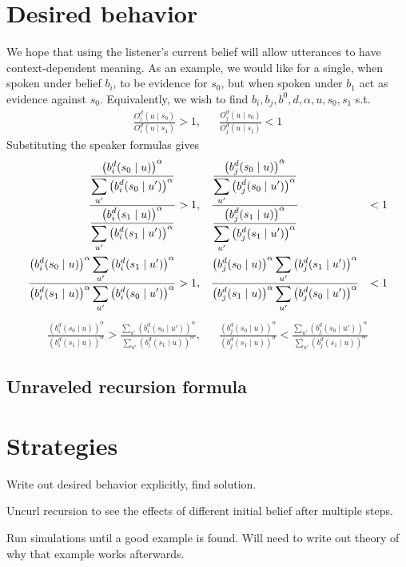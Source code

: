 \documentclass[12pt,fleqn,leqno,letterpaper]{article}
\newcommand\lstn[4]{b_{#4}^{#3}({#1}\mid {#2})}
\newcommand\lstna[4]{\left(\lstn{#1}{#2}{#3}{#4}\right)^{\alpha}}
\newcommand\spkr[4]{\ddfrac{\left(b_{#4}^{#3}({#1} \mid {#2})\right)^{\alpha}}{\sum_{u'}\left(b_{#4}^{#3}({#1} \mid u')\right)^{\alpha}}}
\newcommand\spkrrat[5]{\ddfrac{\left(\lstn{#1}{#3}{#4}{#5}\right)^{\alpha}\sum_{u'}\left(\lstn{#2}{u'}{#4}{#5}\right)^{\alpha}}{\left(\lstn{#2}{#3}{#4}{#5} \right)^{\alpha}\sum_{u'}\left(\lstn{#1}{u'}{#4}{#5}\right)^{\alpha}}}
\def\ddfrac#1#2{\displaystyle\frac{\displaystyle #1}{\displaystyle #2}}
\begin{document}
\section{Desired behavior}
We hope that using the listener's current belief will allow utterances to have context-dependent meaning. As an example, we would like for a single, when spoken under belief $b_i$, to be evidence for $s_0$, but when spoken under $b_1$ act as evidence against $s_0$. 
Equivalently, we wish to find $b_i, b_j, b^0, d, \alpha, u, s_0, s_1$ s.t.
\begin{align}
    \ddfrac{O_i^d(u \mid s_0)}{O_i^d(u \mid s_1)} > 1, && \ddfrac{O_j^d(u \mid s_0)}{O_j^d(u \mid s_1)} < 1
\end{align}
Substituting the speaker formulas gives
\begin{align}
	\ddfrac{\spkr{s_0}{u}{d}{i}}{\spkr{s_1}{u}{d}{i}} &> 1, && \ddfrac{\spkr{s_0}{u}{d}{j}}{\spkr{s_1}{u}{d}{j}} &< 1\\
	\spkrrat{s_0}{s_1}{u}{d}{i} &> 1, && \spkrrat{s_0}{s_1}{u}{d}{j} &< 1
\end{align}
\begin{align}
	\ddfrac{\lstna{s_0}{u}{d}{i}}{\lstna{s_1}{u}{d}{i}} > \ddfrac{\sum_{u'}\lstna{s_0}{u'}{d}{i}}{\sum_{u'}\lstna{s_1}{u}{d}{i}}, && \ddfrac{\lstna{s_0}{u}{d}{j}}{\lstna{s_1}{u}{d}{j}} < \ddfrac{\sum_{u'}\lstna{s_0}{u'}{d}{j}}{\sum_{u'}\lstna{s_1}{u}{d}{j}}
\end{align}

\subsection{Unraveled recursion formula}
\section{Strategies}
Write out desired behavior explicitly, find solution. 

Uncurl recursion to see the effects of different initial belief after multiple steps.

Run simulations until a good example is found. Will need to write out theory of why that example works afterwards.
\end{document}
